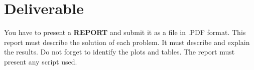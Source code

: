 \documentclass{article}
\begin{document}
%
%
%


%
%
%



\section*{Deliverable}
You have to present a \textbf{REPORT} and submit it as a file in .PDF format. This report must describe the solution of each problem. It must describe and explain the results. Do not forget to identify the plots and tables. The report must present any script used.\\
\end{document}
